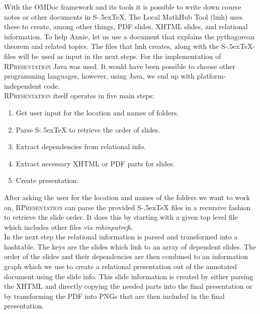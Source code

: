 \documentclass[twoside, 12pt]{article}
\def\stex{\texorpdfstring{\raisebox{-.5ex}S\kern-.5ex\TeX}{sTeX}\xspace}
\def\sTeX{\stex}
\newcommand{\sys}{\textsc{RPresentation}\xspace}
\begin{document}
\begin{figure}
\vspace{-50pt}
\end{figure}

With the OMDoc framework and its tools it is possible to write down course notes or other documents in \stex. The Local MathHub Tool (lmh) uses these to create, among other things, PDF slides, XHTML slides, and relational information. To help Annie, let us use a document that explains the pythagorean theorem and related topics. The files that lmh creates, along with the \stex -files will be used as input in the next steps. For the implementation of  \sys Java was used. It would have been possible to choose other programming languages, however, using Java, we end up with platform-independent code.\\

\sys itself operates in five main steps:\\
\vspace{-12pt}
\begin{enumerate}[topsep=0pt,itemsep=-1ex,partopsep=1ex,parsep=1ex]
\item Get user input for the location and names of folders.
\item Parse \sTeX to retrieve the order of slides.
\item Extract dependencies from relational info.
\item Extract necessary XHTML or PDF parts for slides.
\item Create presentation.
\end{enumerate}
\vspace{5pt}

After asking the user for the location and names of the folders we want to work on, \sys can parse the provided \stex files in a recursive fashion to retrieve the slide order. It does this by starting with a given top level file which includes other files via \textit{mhinputref}s.\\

In the next step the relational information is parsed and transformed into a hashtable. The keys are the slides which link to an array of dependent slides. The order of the slides and their dependencies are then combined to an information graph which we use to create a relational presentation out of the annotated document using the slide info. This slide information is created by either parsing the XHTML and directly copying the needed parts into the final presentation or by transforming the PDF into PNGs that are then included in the final presentation.\\
\end{document}
